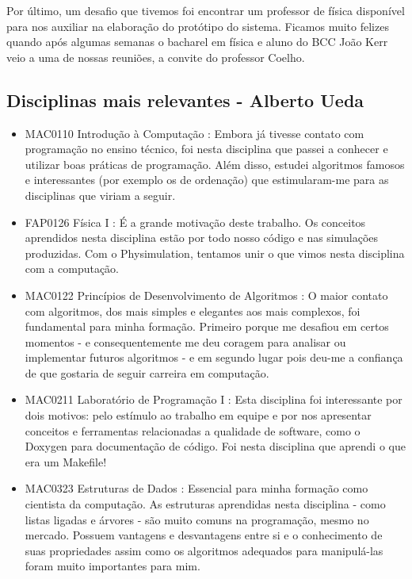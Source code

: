 Por último, um desafio que tivemos foi encontrar um professor de física disponível para nos auxiliar na elaboração do protótipo do sistema. Ficamos muito felizes quando após algumas semanas o bacharel em física e aluno do BCC João Kerr veio a uma de nossas reuniões, a convite do professor Coelho.\\

\subsection{Disciplinas mais relevantes - Alberto Ueda}

\begin{itemize}

\item MAC0110   Introdução à Computação : Embora já tivesse contato com programação no ensino técnico, foi nesta disciplina que passei a conhecer e utilizar boas práticas de programação. Além disso, estudei algoritmos famosos e interessantes (por exemplo os de ordenação) que estimularam-me para as disciplinas que viriam a seguir.

\item FAP0126 	Física I : É a grande motivação deste trabalho. Os conceitos aprendidos nesta disciplina estão por todo nosso código e nas simulações produzidas. Com o Physimulation, tentamos unir o que vimos nesta disciplina com a computação.
 
\item MAC0122 	Princípios de Desenvolvimento de Algoritmos : O maior contato com algoritmos, dos mais simples e elegantes aos mais complexos, foi fundamental para minha formação. Primeiro porque me desafiou em certos momentos - e consequentemente me deu coragem para analisar ou implementar futuros algoritmos - e em segundo lugar pois deu-me a confiança de que gostaria de seguir carreira em computação.
 
\item MAC0211 	Laboratório de Programação I : Esta disciplina foi interessante por dois motivos: pelo estímulo ao trabalho em equipe e por nos apresentar conceitos e ferramentas relacionadas a qualidade de software, como o Doxygen para documentação de código. Foi nesta disciplina que aprendi o que era um Makefile!

\item MAC0323 	Estruturas de Dados : Essencial para minha formação como cientista da computação. As estruturas aprendidas nesta disciplina - como listas ligadas e árvores - são muito comuns na programação, mesmo no mercado. Possuem vantagens e desvantagens entre si e o conhecimento de suas propriedades assim como os algoritmos adequados para manipulá-las foram muito importantes para mim.


\end{itemize}
